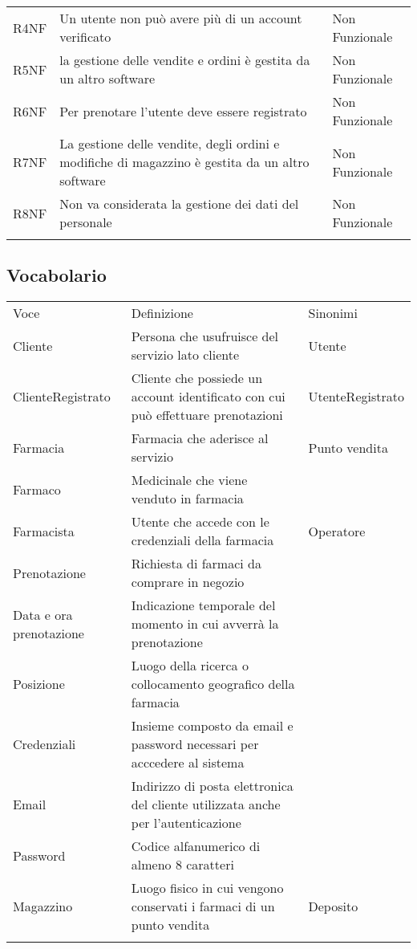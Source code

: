 \begin{longtable}[c]{@{}lll@{}}
R4NF & Un utente non può avere più di un account verificato & Non
Funzionale
\\\addlinespace
R5NF & la gestione delle vendite e ordini è gestita da un altro software
& Non Funzionale
\\\addlinespace
R6NF & Per prenotare l'utente deve essere registrato & Non Funzionale
\\\addlinespace
R7NF & La gestione delle vendite, degli ordini e modifiche di magazzino
è gestita da un altro software & Non Funzionale
\\\addlinespace
R8NF & Non va considerata la gestione dei dati del personale & Non
Funzionale
\\\addlinespace
\bottomrule
\end{longtable}

\subsection{Vocabolario}\label{vocabolario}

\begin{longtable}[c]{@{}lll@{}}
\toprule\addlinespace
Voce & Definizione & Sinonimi
\\\addlinespace
\midrule\endhead
Cliente & Persona che usufruisce del servizio lato cliente & Utente
\\\addlinespace
ClienteRegistrato & Cliente che possiede un account identificato con cui
può effettuare prenotazioni & UtenteRegistrato
\\\addlinespace
Farmacia & Farmacia che aderisce al servizio & Punto vendita
\\\addlinespace
Farmaco & Medicinale che viene venduto in farmacia
\\\addlinespace
Farmacista & Utente che accede con le credenziali della farmacia &
Operatore
\\\addlinespace
Prenotazione & Richiesta di farmaci da comprare in negozio
\\\addlinespace
Data e ora prenotazione & Indicazione temporale del momento in cui
avverrà la prenotazione
\\\addlinespace
Posizione & Luogo della ricerca o collocamento geografico della farmacia
\\\addlinespace
Credenziali & Insieme composto da email e password necessari per
acccedere al sistema
\\\addlinespace
Email & Indirizzo di posta elettronica del cliente utilizzata anche per
l'autenticazione
\\\addlinespace
Password & Codice alfanumerico di almeno 8 caratteri
\\\addlinespace
Magazzino & Luogo fisico in cui vengono conservati i farmaci di un punto
vendita & Deposito
\\\addlinespace
\bottomrule
\end{longtable}

